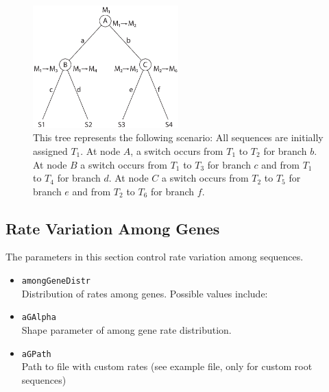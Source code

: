 \documentclass[11pt]{article}
\begin{document}
\begin{itemize}
\begin{figure}[h!]
    \centering
    \includegraphics[width=0.5\textwidth]{modelswitchtree.pdf}
    \caption{This tree represents the following scenario: All sequences are initially assigned $T_{1}$. At node $A$, a switch occurs from $T_{1}$ to $T_{2}$ for branch $b$. At node $B$ a switch occurs from $T_{1}$ to $T_{3}$ for branch $c$ and from $T_{1}$ to $T_{4}$ for branch $d$. At node $C$ a switch occurs from $T_{2}$ to $T_{5}$ for branch $e$ and from $T_{2}$ to $T_{6}$ for branch $f$.}
    \label{fig.modelswitchtree}
\end{figure}
\end{itemize}

\subsection{Rate Variation Among Genes}
The parameters in this section control rate variation among sequences.
\begin{itemize}
\item{\texttt{amongGeneDistr}} \hfill \\
Distribution of rates among genes. Possible values include:
\item{\texttt{aGAlpha}} \hfill \\
Shape parameter of among gene rate distribution.
\item{\texttt{aGPath}} \hfill \\
Path to file with custom rates (see example file, only for custom root sequences)
\end{itemize}
\end{document}
